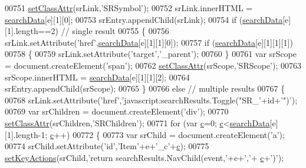 \begin{DoxyCode}
00751     \hyperlink{search_8js_a499422fc054a5278ae32801ec0082c56}{setClassAttr}(srLink,\textcolor{stringliteral}{'SRSymbol'});
00752     srLink.innerHTML = \hyperlink{all__0_8js_ad01a7523f103d6242ef9b0451861231e}{searchData}[e][1][0];
00753     srEntry.appendChild(srLink);
00754     \textcolor{keywordflow}{if} (\hyperlink{all__0_8js_ad01a7523f103d6242ef9b0451861231e}{searchData}[e][1].length==2) \textcolor{comment}{// single result}
00755     \{
00756       srLink.setAttribute(\textcolor{stringliteral}{'href'},\hyperlink{all__0_8js_ad01a7523f103d6242ef9b0451861231e}{searchData}[e][1][1][0]);
00757       \textcolor{keywordflow}{if} (\hyperlink{all__0_8js_ad01a7523f103d6242ef9b0451861231e}{searchData}[e][1][1][1])
00758       \{
00759        srLink.setAttribute(\textcolor{stringliteral}{'target'},\textcolor{stringliteral}{'\_parent'});
00760       \}
00761       var srScope = document.createElement(\textcolor{stringliteral}{'span'});
00762       \hyperlink{search_8js_a499422fc054a5278ae32801ec0082c56}{setClassAttr}(srScope,\textcolor{stringliteral}{'SRScope'});
00763       srScope.innerHTML = \hyperlink{all__0_8js_ad01a7523f103d6242ef9b0451861231e}{searchData}[e][1][1][2];
00764       srEntry.appendChild(srScope);
00765     \}
00766     \textcolor{keywordflow}{else} \textcolor{comment}{// multiple results}
00767     \{
00768       srLink.setAttribute(\textcolor{stringliteral}{'href'},\textcolor{stringliteral}{'javascript:searchResults.Toggle("SR\_'}+\textcolor{keywordtype}{id}+\textcolor{stringliteral}{'")'});
00769       var srChildren = document.createElement(\textcolor{stringliteral}{'div'});
00770       \hyperlink{search_8js_a499422fc054a5278ae32801ec0082c56}{setClassAttr}(srChildren,\textcolor{stringliteral}{'SRChildren'});
00771       \textcolor{keywordflow}{for} (var \hyperlink{jquery_8js_abce695e0af988ece0826d9ad59b8160d}{c}=0; \hyperlink{jquery_8js_abce695e0af988ece0826d9ad59b8160d}{c}<\hyperlink{all__0_8js_ad01a7523f103d6242ef9b0451861231e}{searchData}[e][1].length-1; \hyperlink{jquery_8js_abce695e0af988ece0826d9ad59b8160d}{c}++)
00772       \{
00773         var srChild = document.createElement(\textcolor{charliteral}{'a'});
00774         srChild.setAttribute(\textcolor{stringliteral}{'id'},\textcolor{stringliteral}{'Item'}+e+\textcolor{stringliteral}{'\_c'}+\hyperlink{jquery_8js_abce695e0af988ece0826d9ad59b8160d}{c});
00775         \hyperlink{search_8js_a98192fa2929bb8e4b0a890a4909ab9b2}{setKeyActions}(srChild,\textcolor{stringliteral}{'return searchResults.NavChild(event,'}+e+\textcolor{charliteral}{','}+
      \hyperlink{jquery_8js_abce695e0af988ece0826d9ad59b8160d}{c}+\textcolor{charliteral}{')'});

\end{DoxyCode}
